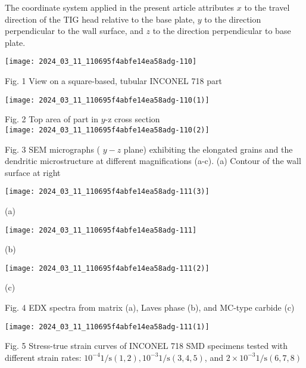 \documentclass[10pt]{article}
\begin{document}
The coordinate system applied in the present article attributes $x$ to the travel direction of the TIG head relative to the base plate, $y$ to the direction perpendicular to the wall surface, and $z$ to the direction perpendicular to base plate.

\begin{center}
\texttt{[image: 2024\_03\_11\_110695f4abfe14ea58adg-110]}
\end{center}

Fig. 1 View on a square-based, tubular INCONEL 718 part

\begin{center}
\texttt{[image: 2024\_03\_11\_110695f4abfe14ea58adg-110(1)]}
\end{center}

Fig. 2 Top area of part in $y$-z cross section\\
\texttt{[image: 2024\_03\_11\_110695f4abfe14ea58adg-110(2)]}

Fig. 3 SEM micrographs ( $y-z$ plane) exhibiting the elongated grains and the dendritic microstructure at different magnifications (a-c). (a) Contour of the wall surface at right

\begin{center}
\texttt{[image: 2024\_03\_11\_110695f4abfe14ea58adg-111(3)]}
\end{center}

(a)

\begin{center}
\texttt{[image: 2024\_03\_11\_110695f4abfe14ea58adg-111]}
\end{center}

(b)

\begin{center}
\texttt{[image: 2024\_03\_11\_110695f4abfe14ea58adg-111(2)]}
\end{center}

(c)

Fig. 4 EDX spectra from matrix (a), Laves phase (b), and MC-type carbide (c)

\begin{center}
\texttt{[image: 2024\_03\_11\_110695f4abfe14ea58adg-111(1)]}
\end{center}

Fig. 5 Stress-true strain curves of INCONEL 718 SMD specimens tested with different strain rates: $10^{-4} 1 / \mathrm{s}(1,2), 10^{-3} 1 / \mathrm{s}(3,4,5)$, and $2 \times 10^{-3} 1 / \mathrm{s}(6,7,8)$
\end{document}
